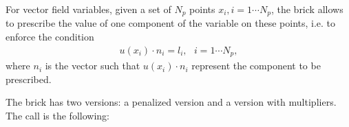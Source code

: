 \documentclass[a4paper,11pt,english]{sphinxmanual}
\begin{document}
For vector field variables, given a set of \(N_p\) points \(x_i, i = 1\cdots N_p\), the brick allows to prescribe the value of one component of the variable on these points, i.e. to enforce the condition
\begin{equation*}
\begin{split}u(x_i)\cdot n_i = l_i, ~~~ i = 1\cdots N_p,\end{split}
\end{equation*}
where \(n_i\) is the vector such that \(u(x_i)\cdot n_i\) represent the component to be prescribed.

The brick has two versions: a penalized version and a version with multipliers. The call is the following:

\begin{sphinxVerbatim}[commandchars=\\\{\}]
  
                 
                

  
                 
                

  
                   
\end{sphinxVerbatim}
\end{document}
